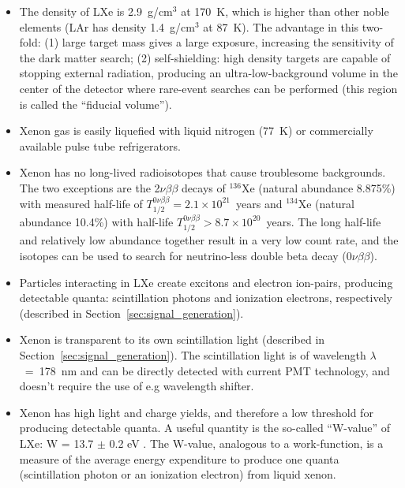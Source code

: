 \begin{itemize}

\item The density of \ac{LXe} is 2.9~g/cm$^{3}$ at 170~K, which is higher than other noble elements (\ac{LAr} has density 1.4~g/cm$^{3}$ at 87~K). The advantage in this two-fold: (1) large target mass gives a large exposure, increasing the sensitivity of the dark matter search; (2) self-shielding: high density targets are capable of stopping external radiation, producing an ultra-low-background volume in the center of the detector where rare-event searches can be performed (this region is called the ``fiducial volume'').
  
\item Xenon gas is easily liquefied with liquid nitrogen (77~K) or commercially available pulse tube refrigerators.

\item Xenon has no long-lived radioisotopes that cause troublesome backgrounds. The two exceptions are the 2$\nu\beta\beta$ decays of $^{136}$Xe (natural abundance 8.875\%) with measured half-life of $T_{1/2}^{0\nu\beta\beta} = 2.1 \times 10^{21}$~years and $^{134}$Xe (natural abundance 10.4\%) with half-life $T_{1/2}^{0\nu\beta\beta} > 8.7 \times 10^{20}$~years. The long half-life and relatively low abundance together result in a very low count rate, and the isotopes can be used to search for neutrino-less double beta decay ($0\nu\beta\beta$).
  
\item Particles interacting in \ac{LXe} create excitons and electron ion-pairs, producing detectable quanta: scintillation photons and ionization electrons, respectively (described in Section~\ref{sec:signal_generation}).
  
\item Xenon is transparent to its own scintillation light (described in Section~\ref{sec:signal_generation}). The scintillation light is of wavelength $\lambda$~=~178~nm and can be directly detected with current \ac{PMT} technology, and doesn't require the use of e.g wavelength shifter. 

\item Xenon has high light and charge yields, and therefore a low threshold for producing detectable quanta. A useful quantity is the so-called ``W-value'' of \ac{LXe}: W = 13.7 $\pm$ 0.2 eV \cite{Dahl2009}. The W-value, analogous to a work-function, is a measure of the average energy expenditure to produce one quanta (scintillation photon or an ionization electron) from liquid xenon. 


\end{itemize}
